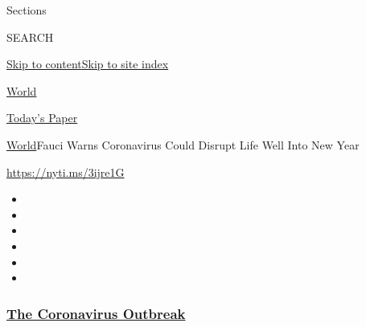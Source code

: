 Sections

SEARCH

\protect\hyperlink{site-content}{Skip to
content}\protect\hyperlink{site-index}{Skip to site index}

\href{https://www.nytimes3xbfgragh.onion/section/world}{World}

\href{https://myaccount.nytimes3xbfgragh.onion/auth/login?response_type=cookie\&client_id=vi}{}

\href{https://www.nytimes3xbfgragh.onion/section/todayspaper}{Today's
Paper}

\href{/section/world}{World}\textbar{}Fauci Warns Coronavirus Could
Disrupt Life Well Into New Year

\url{https://nyti.ms/3ijre1G}

\begin{itemize}
\item
\item
\item
\item
\item
\item
\end{itemize}

\hypertarget{the-coronavirus-outbreak}{%
\subsubsection{\texorpdfstring{\href{https://www.nytimes3xbfgragh.onion/news-event/coronavirus?name=styln-coronavirus-national\&region=TOP_BANNER\&block=storyline_menu_recirc\&action=click\&pgtype=Article\&impression_id=8e384540-f52c-11ea-8f04-2b90ba9625cc\&variant=undefined}{The
Coronavirus
Outbreak}}{The Coronavirus Outbreak}}\label{the-coronavirus-outbreak}}

